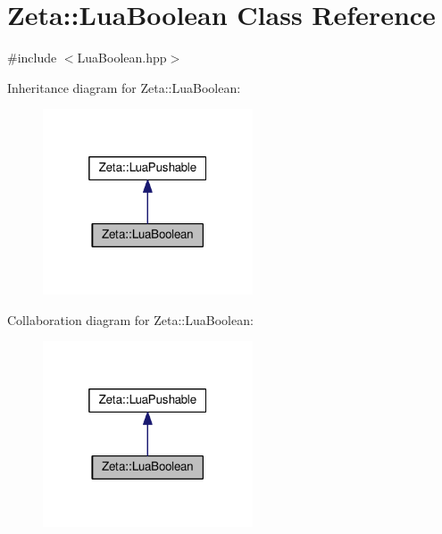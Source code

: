 \hypertarget{classZeta_1_1LuaBoolean}{\section{Zeta\+:\+:Lua\+Boolean Class Reference}
\label{classZeta_1_1LuaBoolean}
}


{\ttfamily \#include $<$Lua\+Boolean.\+hpp$>$}



Inheritance diagram for Zeta\+:\+:Lua\+Boolean\+:\nopagebreak
\begin{figure}[H]
\begin{center}
\leavevmode
\includegraphics[width=176pt]{classZeta_1_1LuaBoolean__inherit__graph}
\end{center}
\end{figure}


Collaboration diagram for Zeta\+:\+:Lua\+Boolean\+:\nopagebreak
\begin{figure}[H]
\begin{center}
\leavevmode
\includegraphics[width=176pt]{classZeta_1_1LuaBoolean__coll__graph}
\end{center}
\end{figure}

